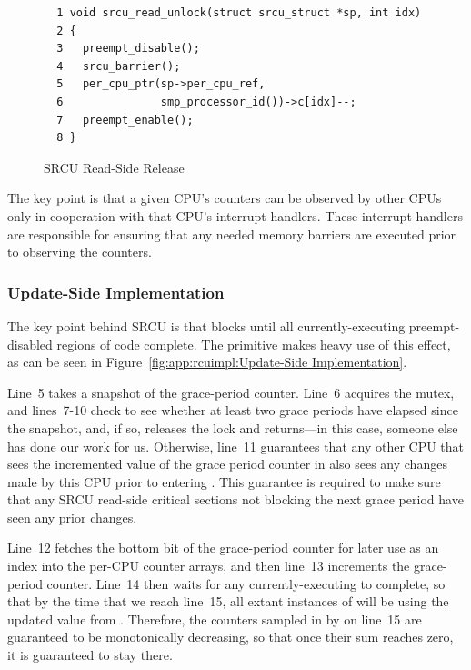 \begin{figure}[htbp]
{ \scriptsize
\begin{verbatim}
  1 void srcu_read_unlock(struct srcu_struct *sp, int idx)
  2 {
  3   preempt_disable();
  4   srcu_barrier();
  5   per_cpu_ptr(sp->per_cpu_ref,
  6               smp_processor_id())->c[idx]--;
  7   preempt_enable();
  8 }
\end{verbatim}
}
\caption{SRCU Read-Side Release}
\label{fig:app:rcuimpl:Read-Side Release}
\end{figure}

The key point is that a given CPU's counters
can be observed by other CPUs only in
cooperation with that CPU's interrupt handlers.
These interrupt handlers are responsible for ensuring that any needed
memory barriers are executed prior to observing the counters.

\subsubsection{Update-Side Implementation}
\label{sec:app:rcuimpl:Update-Side Implementation}

The key point behind SRCU is that 
blocks until all currently-executing preempt-disabled regions of
code complete.
The  primitive makes heavy use of this effect,
as can be seen in
Figure~\ref{fig:app:rcuimpl:Update-Side Implementation}.

Line~5 takes a snapshot of the grace-period counter.
Line~6 acquires the mutex, and lines~7-10 check to see whether
at least two grace periods have elapsed since the snapshot,
and, if so, releases the lock and returns---in this case, someone
else has done our work for us.
Otherwise, line~11 guarantees that any other CPU that sees the
incremented value of the grace period counter in 
also sees any changes made by this CPU prior to entering
.
This guarantee is required to make sure that any SRCU read-side
critical sections not blocking the next grace period have seen
any prior changes.

Line~12 fetches the bottom bit of the grace-period counter for later
use as an index into the per-CPU counter arrays, and then line~13
increments the grace-period counter.
Line~14 then waits for any currently-executing 
to complete, so that by the time that we reach line~15, all
extant instances of  will be using the updated
value from .
Therefore, the counters sampled in by 
on line~15 are guaranteed to
be monotonically decreasing, so that once their sum reaches zero, it
is guaranteed to stay there.

